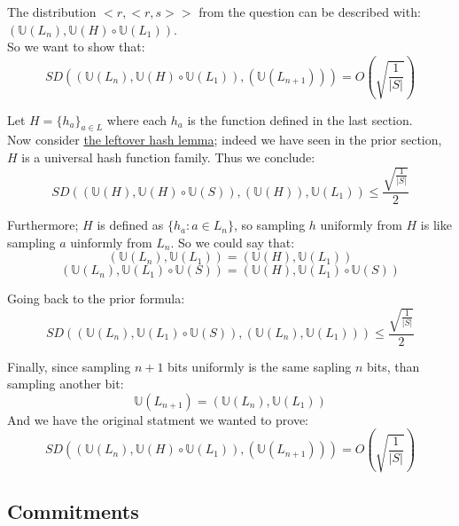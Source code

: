 The distribution $<r,<r,s>>$ from the question
can be described with: $(\mathbb{U}(L_n),\mathbb{U}(H)\circ \mathbb{U}(L_1))$.\\
So we want to show that: 
\[
	SD(
		(\mathbb{U}(L_n),\mathbb{U}(H)\circ \mathbb{U}(L_1))
		,(\mathbb{U}(L_{n+1}))
	)=O(\sqrt{\frac{1}{|S|}})
\]

Let $H=\{h_a\}_{a\in L}$ where each $h_a$ is the function 
defined in the last section.\\
Now consider \href{https://en.wikipedia.org/wiki/Leftover_hash_lemma}
{the leftover hash lemma}; indeed we have seen in the prior section,
$H$ is a universal hash function family. Thus we conclude:
\[
	SD((\mathbb{U}(H),\mathbb{U}(H)\circ \mathbb{U}(S)), (\mathbb{U}(H)), \mathbb{U}(L_1))
	\leq\frac{\sqrt{\frac{1}{|S|}}}{2}
\]

Furthermore; $H$ is defined as $\{h_a:a\in L_n\}$, so sampling
$h$ uniformly from $H$ is like sampling $a$ uinformly from $L_n$. So we could
say that:
\[
	(\mathbb{U}(L_n),\mathbb{U}(L_1))
	=(\mathbb{U}(H),\mathbb{U}(L_1))
\]
\[
	(\mathbb{U}(L_n),\mathbb{U}(L_1)\circ \mathbb{U}(S))
	=(\mathbb{U}(H),\mathbb{U}(L_1)\circ \mathbb{U}(S))
\]

Going back to the prior formula:
\[
	SD((\mathbb{U}(L_n),\mathbb{U}(L_1)\circ \mathbb{U}(S))
	,(\mathbb{U}(L_n),\mathbb{U}(L_1)))
	\leq \frac{\sqrt{\frac{1}{|S|}}}{2}
\]

Finally, since sampling $n+1$ bits uniformly is the same
sapling $n$ bits, than sampling another bit:
\[\mathbb{U}(L_{n+1})=(\mathbb{U}(L_n), \mathbb{U}(L_1))\]
And we have the original statment we wanted to prove:
\[
	SD(
		(\mathbb{U}(L_n),\mathbb{U}(H)\circ \mathbb{U}(L_1))
		,(\mathbb{U}(L_{n+1}))
	)=O(\sqrt{\frac{1}{|S|}})
\]

\subsection{Commitments}
